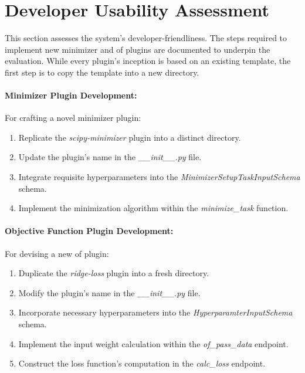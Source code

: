 \documentclass[
  a4paper,  %
  twoside,  %
  bibliography=totoc,
  headsepline,
  cleardoublepage=empty,
  parskip=half,
  draft=false
]{scrbook}
\begin{document}
\section{Developer Usability Assessment}
\label{sec:usabilityForDevelopers}

This section assesses the system's developer-friendliness.
The steps required to implement new minimizer and \gls{of} plugins are documented to underpin the evaluation.
While every plugin's inception is based on an existing template, the first step is to copy the template into a new directory.

\paragraph{Minimizer Plugin Development:}
\label{subsec:implementingAMinimizerPlugin}

For crafting a novel minimizer plugin:

\begin{enumerate}
  \item Replicate the \emph{scipy-minimizer} plugin into a distinct directory.
  \item Update the plugin's name in the \emph{\_\_init\_\_.py} file.
  \item Integrate requisite hyperparameters into the \emph{MinimizerSetupTaskInputSchema} schema.
  \item Implement the minimization algorithm within the \emph{minimize\_task} function.
\end{enumerate}

\paragraph{Objective Function Plugin Development:}
\label{subsec:implementingAnObjectiveFunctionPlugin}

For devising a new \gls{of} plugin:

\begin{enumerate}
  \item Duplicate the \emph{ridge-loss} plugin into a fresh directory.
  \item Modify the plugin's name in the \emph{\_\_init\_\_.py} file.
  \item Incorporate necessary hyperparameters into the \emph{HyperparamterInputSchema} schema.
  \item Implement the input weight calculation within the \emph{of\_pass\_data} endpoint.
  \item Construct the loss function's computation in the \emph{calc\_loss} endpoint.
\end{enumerate}
\end{document}
